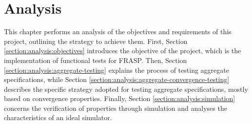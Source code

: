 
\chapter{Analysis}
\label{chapter:analysis}

This chapter performs an analysis of the objectives and requirements of this
project, outlining the strategy to achieve them. First, Section
\ref{section:analysis:objectives} introduces the objective of the project,
which is the implementation of functional tests for FRASP. Then, Section
\ref{section:analysis:aggregate-testing} explains the process of testing
aggregate specifications, while Section
\ref{section:analysis:aggregate-convergence-testing} describes the specific
strategy adopted for testing aggregate specifications, mostly based on
convergence properties. Finally, Section \ref{section:analysis:simulation}
concerns the verification of properties through simulation and analyses the
characteristics of an ideal simulator.






